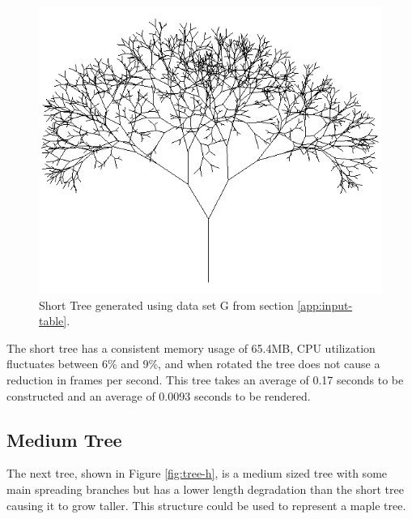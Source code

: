 \documentclass[final]{cmpreport}
\begin{document}
\begin{figure}[ht]
    \includegraphics[scale=0.7]{tree-g.PNG} 
    \centering
    \captionsetup{justification=centering}
    \caption{Short Tree generated using data set G from section \ref{app:input-table}.}
    \label{fig:tree-g}
\end{figure}

The short tree has a consistent memory usage of 65.4MB, CPU utilization fluctuates between 6\% and 9\%, 
and when rotated the tree does not cause a reduction in frames per second. This tree takes an average of
0.17 seconds to be constructed and an average of 0.0093 seconds to be rendered.

\subsection{Medium Tree}
The next tree, shown in Figure \ref{fig:tree-h}, is a medium sized tree with some main spreading 
branches but has a lower length degradation than the short tree causing it to grow taller. This 
structure could be used to represent a maple tree.
\end{document}
